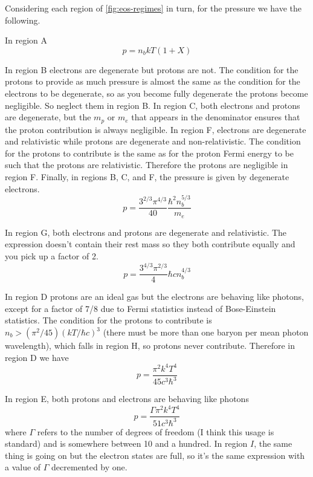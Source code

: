 \documentclass{emulateapj}
\begin{document}
Considering each region of \ref{fig:eos-regimes} in turn, for the
pressure we have the following.


In region A
\begin{equation}
  p = n_b k T (1+X)
\end{equation}

In region B electrons are degenerate but protons are not.  The
condition for the protons to provide as much pressure is almost the
same as the condition for the electrons to be degenerate, so as you
become fully degenerate the protons become negligible.  So neglect
them in region B.  In region C, both electrons and protons are
degenerate, but the $m_p$ or $m_e$ that appears in the denominator
ensures that the proton contribution is always negligible.  In region
F, electrons are degenerate and relativistic while protons are
degenerate and non-relativistic.  The condition for the protons to
contribute is the same as for the proton Fermi energy to be such that
the protons are relativistic.  Therefore the protons are negligible in
region F.  Finally, in regions B, C, and F, the pressure is given by
degenerate electrons.
\begin{equation}
  p = \frac{ 3^{2/3} \pi^{4/3}}{40} \frac{\hbar^2 n_b^{5/3}}{m_e}
\end{equation}

In region G, both electrons and protons are degenerate and
relativistic.  The expression doesn't contain their rest mass so they
both contribute equally and you pick up a factor of 2.
\begin{equation}
  p = \frac{3^{4/3} \pi^{2/3} }{4} \hbar c n_b^{4/3}
\end{equation}

In region D protons are an ideal gas but the electrons are behaving
like photons, except for a factor of 7/8 due to Fermi statistics instead of
Bose-Einstein statistics.  
The condition for the protons to contribute is $n_b >
(\pi^2/45) (k T / \hbar c)^3$ (there must be more than one baryon per
mean photon wavelength), which falls in region H, so protons never
contribute.  Therefore in region D we have
\begin{equation}
  p = \frac{\pi^2 k^4 T^4}{45 c^3 \hbar^3}
\end{equation}

In region E, both protons and electrons are behaving like photons
\begin{equation}
  p = \frac{\Gamma \pi^2 k^4 T^4}{51 c^3 \hbar^3}
\end{equation}
where $\Gamma$ refers to the number of degrees of freedom (I think
this usage is standard) and is somewhere between 10 and a hundred.  In
region $I$, the same thing is going on but the electron states are
full, so it's the same expression with a value of $\Gamma$ decremented
by one.
\end{document}

